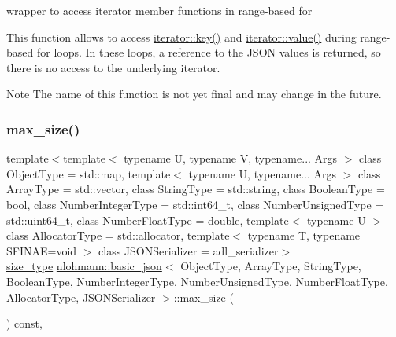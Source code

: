 wrapper to access iterator member functions in range-\/based for 

This function allows to access \mbox{\hyperlink{classnlohmann_1_1basic__json_1_1iter__impl_a030a45b63b70e12b18ad4f6c1c4f1239}{iterator\+::key()}} and \mbox{\hyperlink{classnlohmann_1_1basic__json_1_1iter__impl_a92e849ca687355935c02f492be936b68}{iterator\+::value()}} during range-\/based for loops. In these loops, a reference to the J\+S\+ON values is returned, so there is no access to the underlying iterator.

\begin{DoxyNote}{Note}
The name of this function is not yet final and may change in the future. 
\end{DoxyNote}
\mbox{\label{classnlohmann_1_1basic__json_a2f47d3c6a441c57dd2be00449fbb88e1}} 
\subsubsection{\texorpdfstring{max\_size()}{max\_size()}}
{\footnotesize\ttfamily template$<$template$<$ typename U, typename V, typename... Args $>$ class Object\+Type = std\+::map, template$<$ typename U, typename... Args $>$ class Array\+Type = std\+::vector, class String\+Type  = std\+::string, class Boolean\+Type  = bool, class Number\+Integer\+Type  = std\+::int64\+\_\+t, class Number\+Unsigned\+Type  = std\+::uint64\+\_\+t, class Number\+Float\+Type  = double, template$<$ typename U $>$ class Allocator\+Type = std\+::allocator, template$<$ typename T, typename S\+F\+I\+N\+A\+E=void $>$ class J\+S\+O\+N\+Serializer = adl\+\_\+serializer$>$ \\
\mbox{\hyperlink{classnlohmann_1_1basic__json_a39f2cd0b58106097e0e67bf185cc519b}{size\+\_\+type}} \mbox{\hyperlink{classnlohmann_1_1basic__json}{nlohmann\+::basic\+\_\+json}}$<$ Object\+Type, Array\+Type, String\+Type, Boolean\+Type, Number\+Integer\+Type, Number\+Unsigned\+Type, Number\+Float\+Type, Allocator\+Type, J\+S\+O\+N\+Serializer $>$\+::max\+\_\+size (\begin{DoxyParamCaption}{ }\end{DoxyParamCaption}) const\hspace{0.3cm}{\ttfamily [inline]}, {\ttfamily [noexcept]}}



